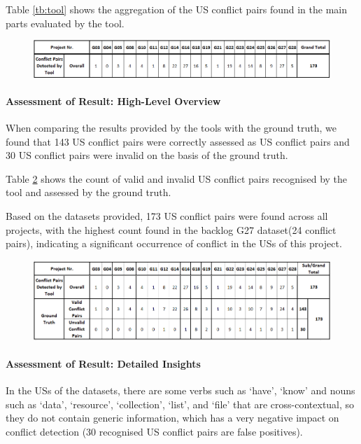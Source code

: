 Table \ref{tb:tool} shows the aggregation of the US conflict pairs found in the main parts evaluated by the tool.
\begin{figure}[h]
	\begingroup
	\scriptsize
	\centering
	\includegraphics[scale=0.55]{Table/conflict_tool.png}
	\label{tb:conflict_tool}
	\endgroup
\end{figure}
\paragraph{Assessment of Result: High-Level Overview}When comparing the results provided by the tools with the ground truth, we found that 143 US conflict pairs were correctly assessed as US conflict pairs and 30 US conflict pairs were invalid on the basis of the ground truth.

Table \ref{tb:conflict_difference} shows the count of valid and invalid US conflict pairs recognised by the tool and assessed by the ground truth.

Based on the datasets provided, 173 US conflict pairs were found across all projects, with the highest count found in the backlog G27 dataset(24 conflict pairs), indicating a significant occurrence of conflict in the USs of this project.
\begin{figure}[h]
	\begingroup
	\scriptsize
	\centering
	\includegraphics[scale=0.55]{Table/conflict_difference.png}
	\label{tb:conflict_difference}
	
	\endgroup
\end{figure}
\paragraph{Assessment of Result: Detailed Insights}In the USs of the datasets, there are some verbs such as ‘have’, ‘know’ and nouns such as ‘data’, ‘resource’, ‘collection’, ‘list’, and ‘file’ that are cross-contextual, so they do not contain generic information, which has a very negative impact on conflict detection (30 recognised US conflict pairs are false positives).

